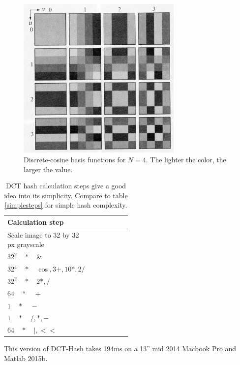 \documentclass[english,12pt,a4paper,pdftex,elec,utf8]{aaltothesis}
\begin{document}
\begin{figure}[htb]
\begin{center}
\includegraphics[height=8cm]{figures/dct}
\end{center}
\caption{Discrete-cosine basis functions for $N = 4$. The lighter the color, the larger the value. \cite[p. 473]{Gonzalez2002}}
\label{dctkernels}
\end{figure}

\def\arraystretch{1.5}
\begin{table}[htb]
\caption{DCT hash calculation steps give a good idea into its simplicity. Compare to table \ref{simplesteps} for simple hash complexity.}
\label{dctsteps}
\begin{center}
\begin{tabular}{lp{0.5\linewidth}}
  Calculation step\\
  \hline\hline
  Scale image to 32 by 32 px grayscale\\
  \hline
  $32^2\quad*\quad \&$ \\
  \hline
  $32^4 \quad*\quad \cos, 3+, 10*, 2/$ \\
  \hline
  $32^2\quad*\quad 2*, /$\\
  \hline
  $64 \quad*\quad +$\\
  \hline
  $1 \quad*\quad -$\\
  \hline
  $1 \quad*\quad /, *, -$\\
  \hline
  $64 \quad*\quad |, <<$\\
  \hline
\end{tabular}
\end{center}\end{table}

This version of DCT-Hash takes 194ms on a 13'' mid 2014 Macbook Pro and Matlab 2015b.
\end{document}
